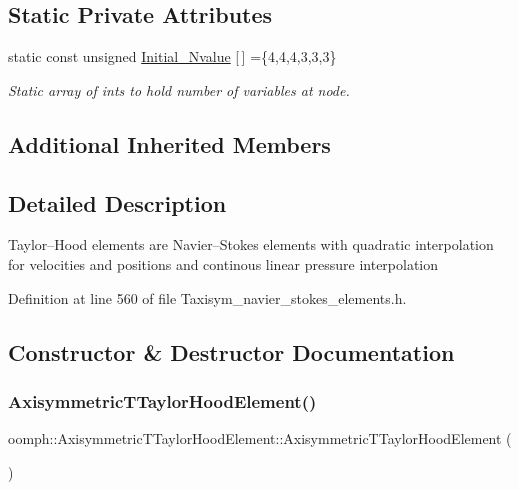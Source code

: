 \subsection*{Static Private Attributes}
\begin{DoxyCompactItemize}
\item 
static const unsigned \hyperlink{classoomph_1_1AxisymmetricTTaylorHoodElement_aa99c5de016b430db779ef2fc830a7f9a}{Initial\+\_\+\+Nvalue} \mbox{[}$\,$\mbox{]} =\{4,4,4,3,3,3\}
\begin{DoxyCompactList}\small\item\em Static array of ints to hold number of variables at node. \end{DoxyCompactList}\end{DoxyCompactItemize}
\subsection*{Additional Inherited Members}


\subsection{Detailed Description}
Taylor--Hood elements are Navier--Stokes elements with quadratic interpolation for velocities and positions and continous linear pressure interpolation 

Definition at line 560 of file Taxisym\+\_\+navier\+\_\+stokes\+\_\+elements.\+h.



\subsection{Constructor \& Destructor Documentation}
\mbox{\label{classoomph_1_1AxisymmetricTTaylorHoodElement_a0c37daf4d618fad20746a0df0bc0d150}} 
\subsubsection{\texorpdfstring{Axisymmetric\+T\+Taylor\+Hood\+Element()}{AxisymmetricTTaylorHoodElement()}\hspace{0.1cm}{\footnotesize\ttfamily [1/2]}}
{\footnotesize\ttfamily oomph\+::\+Axisymmetric\+T\+Taylor\+Hood\+Element\+::\+Axisymmetric\+T\+Taylor\+Hood\+Element (\begin{DoxyParamCaption}{ }\end{DoxyParamCaption})\hspace{0.3cm}{\ttfamily [inline]}}



